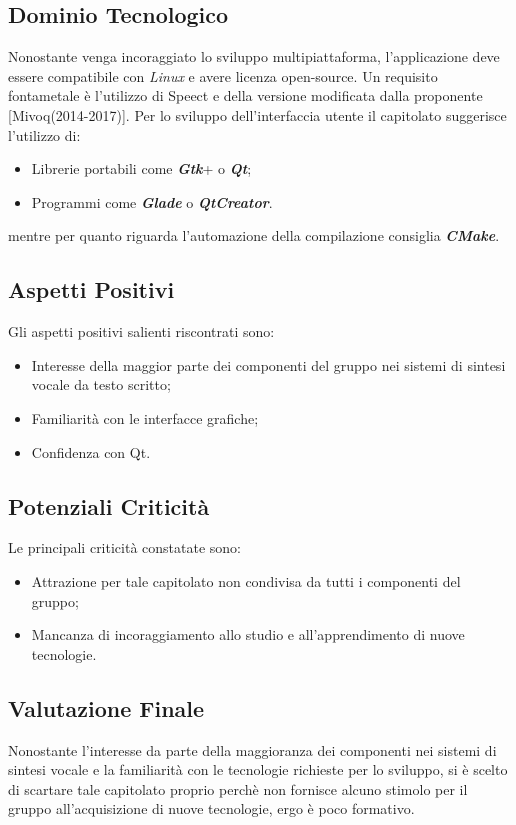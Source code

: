\subsection{Dominio Tecnologico}
	Nonostante venga incoraggiato lo sviluppo multipiattaforma, l'applicazione deve essere compatibile con \textit{Linux} e avere licenza open-source. Un requisito fontametale è l'utilizzo di Speect e della versione modificata dalla proponente [Mivoq(2014-2017)].
	\newline \newline Per lo sviluppo dell'interfaccia utente il capitolato suggerisce l'utilizzo di:
	\begin{itemize}
		\item Librerie portabili come \textit{\textbf{Gtk}}+ o \textit{\textbf{Qt}};
		\item Programmi come \textit{\textbf{Glade}} o \textit{\textbf{QtCreator}}.
	\end{itemize}
	mentre per quanto riguarda l'automazione della compilazione consiglia \textit{\textbf{CMake}}.
	
\subsection{Aspetti Positivi}
	Gli aspetti positivi salienti riscontrati sono:
	\begin{itemize}
		\item Interesse della maggior parte dei componenti del gruppo nei sistemi di sintesi vocale da testo scritto;
		\item Familiarità con le interfacce grafiche;
		\item Confidenza con Qt.
	\end{itemize}
	
\subsection{Potenziali Criticità}
	Le principali criticità constatate sono:
	\begin{itemize}
		\item Attrazione per tale capitolato non condivisa da tutti i componenti del gruppo;
		\item Mancanza di incoraggiamento allo studio e all'apprendimento di nuove tecnologie.
	\end{itemize}

\subsection{Valutazione Finale}
	Nonostante l'interesse da parte della maggioranza dei componenti nei sistemi di sintesi vocale e la familiarità con le tecnologie richieste per lo sviluppo, si è scelto di scartare tale capitolato proprio perchè non fornisce alcuno stimolo per il gruppo all'acquisizione di nuove tecnologie, ergo è poco formativo.